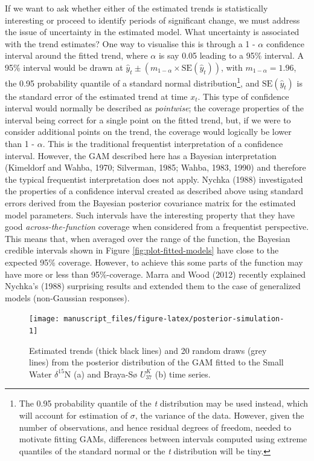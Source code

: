 \documentclass[12pt,]{article}
\newcommand{\uk}{\ensuremath{\mathit{U}^{\mathit{K}}_{\mathup{37}}}}
\begin{document}
If we want to ask whether either of the estimated trends is
statistically interesting or proceed to identify periods of significant
change, we must address the issue of uncertainty in the estimated model.
What uncertainty is associated with the trend estimates? One way to
visualise this is through a 1 - \(\alpha\) confidence interval around
the fitted trend, where \(\alpha\) is say 0.05 leading to a 95\%
interval. A 95\% interval would be drawn at
\(\hat{y}_t \pm (m_{1-\alpha} \times \text{SE}(\hat{y}_t))\), with
\(m_{1-\alpha} = 1.96\), the 0.95 probability quantile of a standard
normal distribution\footnote{The 0.95 probability quantile of the
  \emph{t} distribution may be used instead, which will account for
  estimation of \(\sigma\), the variance of the data. However, given the
  number of observations, and hence residual degrees of freedom, needed
  to motivate fitting GAMs, differences between intervals computed using
  extreme quantiles of the standard normal or the \emph{t} distribution
  will be tiny.}, and \(\text{SE}(\hat{y}_t)\) is the standard error of
the estimated trend at time \(x_t\). This type of confidence interval
would normally be described as \emph{pointwise}; the coverage properties
of the interval being correct for a single point on the fitted trend,
but, if we were to consider additional points on the trend, the coverage
would logically be lower than 1 - \(\alpha\). This is the traditional
frequentist interpretation of a confidence interval. However, the GAM
described here has a Bayesian interpretation (Kimeldorf and Wahba, 1970;
Silverman, 1985; Wahba, 1983, 1990) and therefore the typical
frequentist interpretation does not apply. Nychka (1988) investigated
the properties of a confidence interval created as described above using
standard errors derived from the Bayesian posterior covariance matrix
for the estimated model parameters. Such intervals have the interesting
property that they have good \emph{across-the-function} coverage when
considered from a frequentist perspective. This means that, when
averaged over the range of the function, the Bayesian credible intervals
shown in Figure \ref{fig:plot-fitted-models} have close to the expected
95\% coverage. However, to achieve this some parts of the function may
have more or less than 95\%-coverage. Marra and Wood (2012) recently
explained Nychka's (1988) surprising results and extended them to the
case of generalized models (non-Gaussian responses).

\begin{figure}

{\centering \texttt{[image: manuscript\_files/figure-latex/posterior-simulation-1]} 

}

\caption{Estimated trends (thick black lines) and 20 random draws (grey lines) from the posterior distribution of the GAM fitted to the Small Water $\delta^{15}\text{N}$ (a) and Braya-Sø \uk{} (b) time series.}\label{fig:posterior-simulation}
\end{figure}
\end{document}
